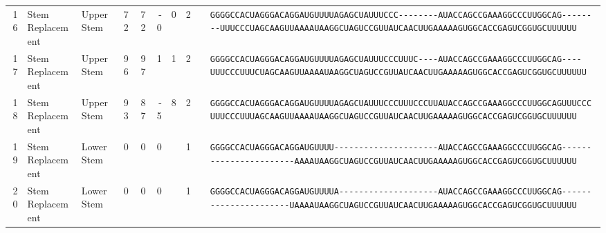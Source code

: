 \begin{tabular}{rllrrrrrcl}
 16 & Stem Replacement & Upper Stem & 72 & 72 & -0 & 0 & 2 &  &
 \color{ucsfdarkgrey}\verb|GGGGCCACUAGGGACAGGAU|\color{ucsforange}\verb|GUUUUA|\color{ucsfblue}\verb|GAGCUAUUUCCC--------|\color{ucsfpurple}\verb|AUACCAGCCGAAAGGCCCUUGGCAG|\color{ucsfblue}\verb|--------UUUCCCUAGCAAGU|\color{ucsforange}\verb|UAAAAUAA|\color{ucsfnavy}\verb|GGCUAGUCC|\color{ucsforange}\verb|GUUAUCA|\color{ucsfteal}\verb|ACUUGAAAAAGUG|\color{ucsforange}\verb|GCACCGAGUCGGUGCUUUUUU| \\

 17 & Stem Replacement & Upper Stem & 96 & 97 & 1 & 1 & 2 &  &
 \color{ucsfdarkgrey}\verb|GGGGCCACUAGGGACAGGAU|\color{ucsforange}\verb|GUUUUA|\color{ucsfblue}\verb|GAGCUAUUUCCCUUUC----|\color{ucsfpurple}\verb|AUACCAGCCGAAAGGCCCUUGGCAG|\color{ucsfblue}\verb|----UUUCCCUUUCUAGCAAGU|\color{ucsforange}\verb|UAAAAUAA|\color{ucsfnavy}\verb|GGCUAGUCC|\color{ucsforange}\verb|GUUAUCA|\color{ucsfteal}\verb|ACUUGAAAAAGUG|\color{ucsforange}\verb|GCACCGAGUCGGUGCUUUUUU| \\

 18 & Stem Replacement & Upper Stem & 93 & 87 & -5 & 8 & 2 &  &
 \color{ucsfdarkgrey}\verb|GGGGCCACUAGGGACAGGAU|\color{ucsforange}\verb|GUUUUA|\color{ucsfblue}\verb|GAGCUAUUUCCCUUUCCCUU|\color{ucsfpurple}\verb|AUACCAGCCGAAAGGCCCUUGGCAG|\color{ucsfblue}\verb|UUUCCCUUUCCCUUUAGCAAGU|\color{ucsforange}\verb|UAAAAUAA|\color{ucsfnavy}\verb|GGCUAGUCC|\color{ucsforange}\verb|GUUAUCA|\color{ucsfteal}\verb|ACUUGAAAAAGUG|\color{ucsforange}\verb|GCACCGAGUCGGUGCUUUUUU| \\

 19 & Stem Replacement & Lower Stem & 0 & 0 & 0 &  & 1 &  &
 \color{ucsfdarkgrey}\verb|GGGGCCACUAGGGACAGGAU|\color{ucsforange}\verb|GUUUU-|\color{ucsfblue}\verb|--------------------|\color{ucsfpurple}\verb|AUACCAGCCGAAAGGCCCUUGGCAG|\color{ucsfblue}\verb|----------------------|\color{ucsforange}\verb|-AAAAUAA|\color{ucsfnavy}\verb|GGCUAGUCC|\color{ucsforange}\verb|GUUAUCA|\color{ucsfteal}\verb|ACUUGAAAAAGUG|\color{ucsforange}\verb|GCACCGAGUCGGUGCUUUUUU| \\

 20 & Stem Replacement & Lower Stem & 0 & 0 & 0 &  & 1 &  &
 \color{ucsfdarkgrey}\verb|GGGGCCACUAGGGACAGGAU|\color{ucsforange}\verb|GUUUUA|\color{ucsfblue}\verb|--------------------|\color{ucsfpurple}\verb|AUACCAGCCGAAAGGCCCUUGGCAG|\color{ucsfblue}\verb|----------------------|\color{ucsforange}\verb|UAAAAUAA|\color{ucsfnavy}\verb|GGCUAGUCC|\color{ucsforange}\verb|GUUAUCA|\color{ucsfteal}\verb|ACUUGAAAAAGUG|\color{ucsforange}\verb|GCACCGAGUCGGUGCUUUUUU| \\


\end{tabular}
